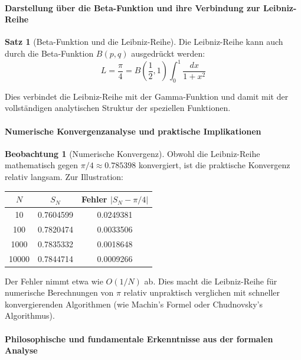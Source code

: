 \documentclass[a4paper,12pt,twoside]{report}
\theoremstyle{definition}
\newtheorem{satz}{Satz}
\newtheorem{beobachtung}{Beobachtung}
\begin{document}
\paragraph{Darstellung über die Beta-Funktion und ihre Verbindung zur Leibniz-Reihe}

\begin{satz}[Beta-Funktion und die Leibniz-Reihe]
Die Leibniz-Reihe kann auch durch die Beta-Funktion $B(p,q)$ ausgedrückt werden:
\begin{equation}
L = \frac{\pi}{4} = B\left(\frac{1}{2}, 1\right) \int_0^1 \frac{dx}{1+x^2}
\end{equation}

Dies verbindet die Leibniz-Reihe mit der Gamma-Funktion und damit mit der vollständigen analytischen Struktur der speziellen Funktionen.
\end{satz}

\paragraph{Numerische Konvergenzanalyse und praktische Implikationen}

\begin{beobachtung}[Numerische Konvergenz]
Obwohl die Leibniz-Reihe mathematisch gegen $\pi/4 \approx 0.785398$ konvergiert, ist die praktische Konvergenz relativ langsam. Zur Illustration:

\begin{center}
\begin{tabular}{c|c|c}
$N$ & $S_N$ & Fehler $|S_N - \pi/4|$ \\
\hline
10 & 0.7604599 & 0.0249381 \\
100 & 0.7820474 & 0.0033506 \\
1000 & 0.7835332 & 0.0018648 \\
10000 & 0.7844714 & 0.0009266 \\
\end{tabular}
\end{center}

Der Fehler nimmt etwa wie $O(1/N)$ ab. Dies macht die Leibniz-Reihe für numerische Berechnungen von $\pi$ relativ unpraktisch verglichen mit schneller konvergierenden Algorithmen (wie Machin's Formel oder Chudnovsky's Algorithmus).
\end{beobachtung}

\paragraph{Philosophische und fundamentale Erkenntnisse aus der formalen Analyse}
\end{document}
